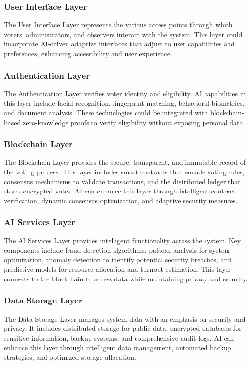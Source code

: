\documentclass[conference]{IEEEtran}
\begin{document}
\subsubsection{User Interface Layer}
The User Interface Layer represents the various access points through which voters, administrators, and observers interact with the system. This layer could incorporate AI-driven adaptive interfaces that adjust to user capabilities and preferences, enhancing accessibility and user experience.

\subsubsection{Authentication Layer}
The Authentication Layer verifies voter identity and eligibility. AI capabilities in this layer include facial recognition, fingerprint matching, behavioral biometrics, and document analysis. These technologies could be integrated with blockchain-based zero-knowledge proofs to verify eligibility without exposing personal data.

\subsubsection{Blockchain Layer}
The Blockchain Layer provides the secure, transparent, and immutable record of the voting process. This layer includes smart contracts that encode voting rules, consensus mechanisms to validate transactions, and the distributed ledger that stores encrypted votes. AI can enhance this layer through intelligent contract verification, dynamic consensus optimization, and adaptive security measures.

\subsubsection{AI Services Layer}
The AI Services Layer provides intelligent functionality across the system. Key components include fraud detection algorithms, pattern analysis for system optimization, anomaly detection to identify potential security breaches, and predictive models for resource allocation and turnout estimation. This layer connects to the blockchain to access data while maintaining privacy and security.

\subsubsection{Data Storage Layer}
The Data Storage Layer manages system data with an emphasis on security and privacy. It includes distributed storage for public data, encrypted databases for sensitive information, backup systems, and comprehensive audit logs. AI can enhance this layer through intelligent data management, automated backup strategies, and optimized storage allocation.
\end{document}
